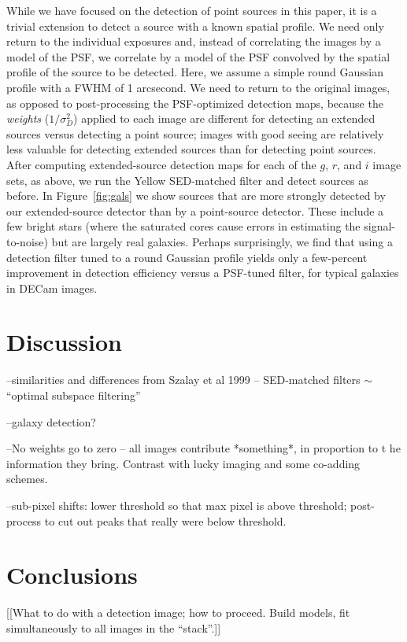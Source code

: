 \documentclass[letterpaper,preprint]{aastex62}
\newcommand{\figref}[1]{\mbox{Figure~\ref{#1}}}
\begin{document}
While we have focused on the detection of point sources in this paper,
it is a trivial extension to detect a source with a known spatial
profile.  We need only return to the individual exposures and, instead
of correlating the images by a model of the PSF, we correlate by a
model of the PSF convolved by the spatial profile of the source to be
detected.  Here, we assume a simple round Gaussian profile with a FWHM
of 1 arcsecond.  We need to return to the original images, as opposed
to post-processing the PSF-optimized detection maps, because the
\emph{weights} ($1/\sigma_{D}^2$) applied to each image are different
for detecting an extended sources versus detecting a point source;
images with good seeing are relatively less valuable for detecting
extended sources than for detecting point sources.  After computing
extended-source detection maps for each of the $g$, $r$, and $i$ image
sets, as above, we run the Yellow SED-matched filter and detect
sources as before.  In \figref{fig:gals} we show sources that are more
strongly detected by our extended-source detector than by a
point-source detector.  These include a few bright stars (where the
saturated cores cause errors in estimating the signal-to-noise) but
are largely real galaxies.  Perhaps surprisingly, we find that using a
detection filter tuned to a round Gaussian profile yields only a
few-percent improvement in detection efficiency versus a PSF-tuned
filter, for typical galaxies in DECam images.


\section{Discussion}

--similarities and differences from Szalay et al 1999 -- SED-matched
filters $\sim$ ``optimal subspace filtering''

--galaxy detection?

--No weights go to zero -- all images contribute *something*, in
proportion to t he information they bring.  Contrast with lucky
imaging and some co-adding schemes.

--sub-pixel shifts: lower threshold so that max pixel is above
threshold; post-process to cut out peaks that really were below
threshold.


\section{Conclusions}

[[What to do with a detection image; how to proceed.  Build models,
    fit simultaneously to all images in the ``stack''.]]
\end{document}
